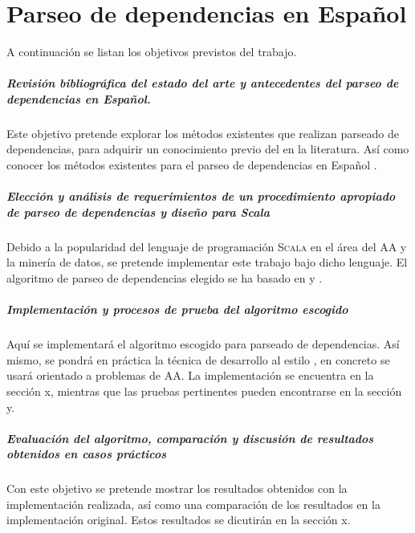 \chapter{Parseo de dependencias en Español}\label{ch:depparsing}

A continuación se listan los objetivos previstos del trabajo.

\paragraph{Revisión bibliográfica del estado del arte y antecedentes del parseo
  de dependencias en Español.} Este objetivo pretende explorar los métodos
existentes que realizan parseado de dependencias, para adquirir un conocimiento
previo del  en la literatura. Así como conocer los
métodos existentes para el parseo de dependencias en Español
\cite{ballesteros2016}.

\paragraph{Elección y análisis de requerimientos de un procedimiento apropiado de
  parseo de dependencias y diseño para Scala}
Debido a la popularidad del lenguaje de programación \textsc{Scala} en el área
del \ac{AA} y la minería de datos, se pretende implementar este trabajo bajo
dicho lenguaje. El algoritmo de parseo de dependencias
elegido se ha basado en \citeauthor{yamada2003} \cite{yamada2003} y
\citeauthor{rohit2016} \cite{rohit2016}.

\paragraph{Implementación y procesos de prueba del algoritmo escogido}
Aquí se implementará el algoritmo escogido para parseado de dependencias. Así
mismo, se pondrá en práctica la técnica de desarrollo al estilo
, en concreto se usará  orientado a
problemas de \ac{AA}. La implementación se encuentra en la 
sección x, mientras que las pruebas pertinentes pueden encontrarse en la
 sección y.

\paragraph{Evaluación del algoritmo, comparación y discusión de resultados
  obtenidos en casos prácticos}
Con este objetivo se pretende mostrar los resultados obtenidos con la
implementación realizada, así como una comparación de los resultados en la
implementación original. Estos resultados se dicutirán en la sección x.

